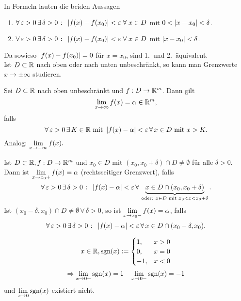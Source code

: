 \documentclass[../ana1.tex]{subfiles}
\begin{document}
\begin{bew}
    In Formeln lauten die beiden Aussagen 
    \begin{enumerate}
        \item \( \forall \, \varepsilon > 0 \,\exists \, \delta > 0
        \; \colon \; \left| f(x) - f(x_0) \right| < \varepsilon \;\forall \;
        x \in D \) mit \( 0 < \left|x-x_0\right| < \delta \).
        \item \( \forall \, \varepsilon > 0 \,\exists \, \delta > 0
        \; \colon \; \left| f(x) - f(x_0) \right| < \varepsilon \;\forall \;
        x \in D \) mit \( \left|x-x_0\right| < \delta \).
    \end{enumerate}
    Da sowieso \( \left|f(x) -f(x_0)\right| = 0 \) für \( x=x_0 \), sind 1.\ und
    2.\ äquivalent.\\
    Ist \( D\subset \mathbb{R} \) nach oben oder nach unten unbeschränkt, so 
    kann man Grenzwerte \( x \rightarrow \pm \infty \) studieren.
\end{bew}
\begin{defi}
    Sei \( D \subset \mathbb{R} \) nach oben unbeschränkt und 
    \( f:D\rightarrow \mathbb{R}^m \). Dann gilt 
    \[ \lim\limits_{x\rightarrow\infty} f(x) = \alpha \in \mathbb{R}^m, \]
    falls
    \[ \forall \,\varepsilon > 0 \,\exists \, K\in\mathbb{R} \text{ mit } 
    \left|f(x) - \alpha\right| < \varepsilon \,\forall \, x \in D 
    \text{ mit } x > K. \]
    Analog: \( \lim\limits_{x\rightarrow -\infty} f(x). \)
\end{defi}
\begin{defi}
    Ist \( D \subset \mathbb{R}, f : D\rightarrow \mathbb{R}^m \) und \( x_0 \in D \)
    mit \( (x_0, x_0 + \delta) \cap D \neq \emptyset \) für alle 
    \( \delta > 0 \). Dann ist \( \lim\limits_{x\rightarrow x_0+} f(x) = \alpha \) 
    (rechtsseitiger Grenzwert), falls
    \[ \forall \,\varepsilon > 0 \,\exists \, \delta > 0 \;\colon \;
    \left| f(x) - \alpha \right| < \varepsilon \,\forall \, \underbrace{ x\in D \cap 
    (x_0, x_0 + \delta) }_{ \text{oder: } x\in D \text{ mit } 
    x_0 < x < x_0 + \delta }. \]
    Ist \( (x_0 - \delta, x_0) \cap D \neq \emptyset \,\forall \, 
    \delta > 0 \), so ist \( \lim\limits_{x\rightarrow x_0-} f(x) = \alpha \), falls
    \[ \forall \, \varepsilon > 0 \,\exists \, \delta > 0 \;\colon \; 
    \left|f(x) - \alpha\right| < \varepsilon \,\forall \, x \in D \cap 
    (x_0 - \delta, x_0). \]
\end{defi}
\begin{bsp}
    \[ x\in\mathbb{R}, \mathrm{sgn}(x) := 
    \begin{cases}
        1,  &x>0\\
        0,  &x=0\\
        -1, &x<0
    \end{cases} \]
    \[ \Rightarrow \lim\limits_{x\rightarrow 0+} \mathrm{sgn}(x) = 1 \quad \lim\limits_{x\rightarrow 0-} \mathrm{sgn}(x) = -1 \]
    und \( \lim\limits_{x\rightarrow 0} \mathrm{sgn}(x) \) existiert nicht.
\end{bsp}
\end{document}
